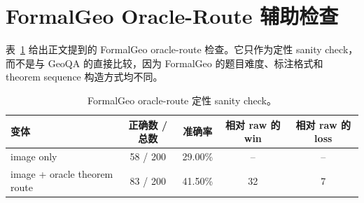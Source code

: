 \documentclass[UTF8,11pt,fontset=fandol]{ctexart}
\begin{document}
\section{FormalGeo Oracle-Route 辅助检查}
\label{app:formalgeo-zh}

表~\ref{tab:formalgeo-oracle-route-zh} 给出正文提到的 FormalGeo oracle-route 检查。它只作为定性 sanity check，而不是与 GeoQA 的直接比较，因为 FormalGeo 的题目难度、标注格式和 theorem sequence 构造方式均不同。

\begin{table}[h]
\centering
\caption{FormalGeo oracle-route 定性 sanity check。}
\label{tab:formalgeo-oracle-route-zh}
\small
\begin{tabular}{lcccc}
\toprule
变体 & 正确数 / 总数 & 准确率 & 相对 raw 的 win & 相对 raw 的 loss \\
\midrule
image only & 58 / 200 & 29.00\% & -- & -- \\
image + oracle theorem route & 83 / 200 & 41.50\% & 32 & 7 \\
\bottomrule
\end{tabular}
\end{table}



\end{document}
